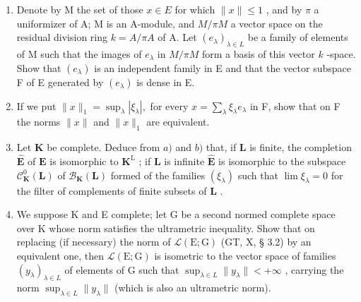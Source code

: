 \begin{enumerate}
\def\labelenumi{\alph{enumi})}
\item
  Denote by M the set of those \(x \in E\) for which \(\| x \| \leqslant 1\) , and by \(\pi\) a uniformizer of A; M is an A-module, and \(M / \pi M\) a vector space on the residual division ring \(k = A / \pi A\) of A. Let \((e_{\lambda})_{\lambda \in L}\) be a family of elements of M such that the images of \(e_{\lambda}\) in \(M / \pi M\) form a basis of this vector \(k\) -space. Show that \((e_{\lambda})\) is an independent family in E and that the vector subspace F of E generated by \((e_{\lambda})\) is dense in E.
\item
  If we put \(\| x\| _1 = \sup_{\lambda}|\xi_\lambda |,\) for every \(x = \sum_{\lambda}\xi_{\lambda}e_{\lambda}\) in F, show that on F the norms \(\| x\|\) and \(\| x\| _1\) are equivalent.
\item
  Let \(\mathbf{K}\) be complete. Deduce from \(a)\) and \(b)\) that, if \(\mathbf{L}\) is finite, the completion \(\hat{\mathbf{E}}\) of \(\mathbf{E}\) is isomorphic to \(\mathbf{K}^{\mathrm{L}}\) ; if \(\mathbf{L}\) is infinite \(\hat{\mathbf{E}}\) is isomorphic to the subspace \(\mathcal{C}_{\mathbf{K}}^{0}(\mathbf{L})\) of \(\mathcal{B}_{\mathbf{K}}(\mathbf{L})\) formed of the families \((\xi_{\lambda})\) such that \(\lim \xi_{\lambda} = 0\) for the filter of complements of finite subsets of \(\mathbf{L}\) .
\item
  We suppose K and E complete; let G be a second normed complete space over K whose norm satisfies the ultrametric inequality. Show that on replacing (if necessary) the norm of \(\mathcal{L}(\mathrm{E};\mathrm{G})\) (GT, X, § 3.2) by an equivalent one, then \(\mathcal{L}(\mathrm{E};\mathrm{G})\) is isometric to the vector space of families \((y_{\lambda})_{\lambda \in L}\) of elements of G such that \(\sup_{\lambda \in L}\| y_{\lambda}\| < +\infty\) , carrying the norm \(\sup_{\lambda \in L}\| y_{\lambda}\|\) (which is also an ultrametric norm).
\end{enumerate}


